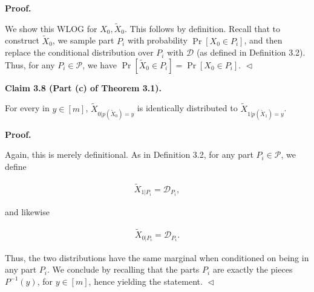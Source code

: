 



\par\medskip\noindent\textbf{
\textbf{Proof}.}\par




We show this WLOG for $X_{0},\widetilde{X}_{0}$. This follows by definition. Recall that to construct $\widetilde{X}_{0}$, we sample part $P_{i}$ with probability $\Pr[X_{0}\in P_{i}]$, and then replace the conditional distribution over $P_{i}$ with $\mathcal{D}$ (as defined in Definition 3.2). Thus, for any $P_{i}\in\mathcal{P}$, we have $\Pr[\widetilde{X}_{0}\in P_{i}]=\Pr[X_{0}\in P_{i}]$.
$\vartriangleleft$\par





\par\medskip\noindent\textbf{
Claim 3.8 (Part (c) of Theorem 3.1). 
}\par



For every in $y\in[m]$, $\widetilde{X}_{0|p(\widetilde{X}_{0})=y}$ is identically distributed to $\widetilde{X}_{1|p(\widetilde{X}_{1})=y}$.\par







\par\medskip\noindent\textbf{
\textbf{Proof}.}\par




Again, this is merely definitional. As in Definition 3.2, for any part $P_{i}\in\mathcal{P}$, we define\par


\[\begin{gathered}
\widetilde{X}_{1|P_{i}}=\mathcal{D}_{P_{i}},
\end{gathered}\]


and likewise\par


\[\begin{gathered}
\widetilde{X}_{0|P_{i}}=\mathcal{D}_{P_{i}}.
\end{gathered}\]


Thus, the two distributions have the same marginal when conditioned on being in any part $P_{i}$. We conclude by recalling that the parts $P_{i}$ are exactly the pieces $P^{-1}(y)$, for $y\in[m]$, hence yielding the statement.
$\vartriangleleft$\par



